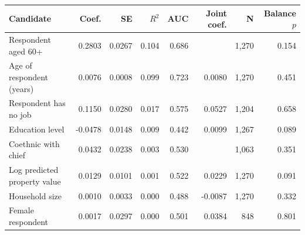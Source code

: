 \begin{tabular}{lrrrrrrr}
\toprule
Candidate & Coef. & SE & $R^2$ & AUC & Joint coef. & N & Balance $p$ \\
\midrule
Respondent aged 60+ & 0.2803 & 0.0267 & 0.104 & 0.686 &  & 1,270 & 0.154 \\
Age of respondent (years) & 0.0076 & 0.0008 & 0.099 & 0.723 & 0.0080 & 1,270 & 0.451 \\
Respondent has no job & 0.1150 & 0.0280 & 0.017 & 0.575 & 0.0527 & 1,204 & 0.658 \\
Education level & -0.0478 & 0.0148 & 0.009 & 0.442 & 0.0099 & 1,267 & 0.089 \\
Coethnic with chief & 0.0432 & 0.0238 & 0.003 & 0.530 &  & 1,063 & 0.351 \\
Log predicted property value & 0.0129 & 0.0101 & 0.001 & 0.522 & 0.0229 & 1,270 & 0.091 \\
Household size & 0.0010 & 0.0033 & 0.000 & 0.488 & -0.0087 & 1,270 & 0.332 \\
Female respondent & 0.0017 & 0.0297 & 0.000 & 0.501 & 0.0384 & 848 & 0.801 \\
\bottomrule
\end{tabular}
